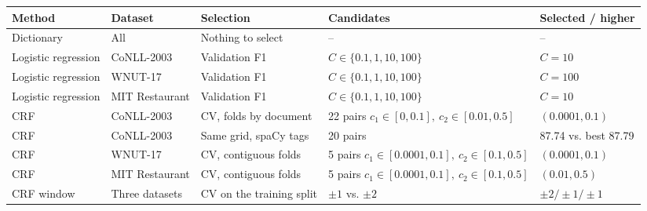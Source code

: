 \begingroup\small\setlength{\tabcolsep}{3pt}
\begin{tabular*}{\linewidth}{@{\extracolsep{\fill}}lllll@{}}
\toprule
Method & Dataset & Selection & Candidates & Selected / higher \\
\midrule
Dictionary & All & Nothing to select & -- & -- \\
Logistic regression & CoNLL-2003 & Validation F1 & $C\in\{0.1,1,10,100\}$ & $C=10$ \\
Logistic regression & WNUT-17 & Validation F1 & $C\in\{0.1,1,10,100\}$ & $C=100$ \\
Logistic regression & MIT Restaurant & Validation F1 & $C\in\{0.1,1,10,100\}$ & $C=10$ \\
CRF & CoNLL-2003 & CV, folds by document & \shortstack[l]{22 pairs \\ $c_1\in[0,0.1],\ c_2\in[0.01,0.5]$} & $(0.0001,0.1)$ \\
CRF & CoNLL-2003 & Same grid, spaCy tags & 20 pairs & 87.74 vs. best 87.79 \\
CRF & WNUT-17 & CV, contiguous folds & \shortstack[l]{5 pairs \\ $c_1\in[0.0001,0.1],\ c_2\in[0.1,0.5]$} & $(0.0001,0.1)$ \\
CRF & MIT Restaurant & CV, contiguous folds & \shortstack[l]{5 pairs \\ $c_1\in[0.0001,0.1],\ c_2\in[0.1,0.5]$} & $(0.01,0.5)$ \\
CRF window & Three datasets & CV on the training split & $\pm1$ vs. $\pm2$ & $\pm2/\pm1/\pm1$ \\
\bottomrule
\end{tabular*}
\endgroup

